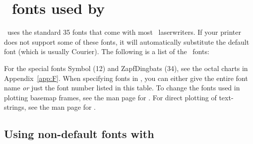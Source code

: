 %
%
\chapter{\PS\ fonts used by \gmt}
\label{app:G}
\thispagestyle{headings}

\GMT\ uses the standard 35 fonts that come with most \PS\
laserwriters.  If your printer does not support some of these
fonts, it will automatically substitute the default font (which is
usually Courier).  The following is
a list of the \GMT\ fonts: \\


For the special fonts Symbol (12) and ZapfDingbats (34), see the
octal charts in Appendix~\ref{app:F}.  When specifying fonts in
\GMT, you can either give the entire font name \emph{or} just the
font number listed in this table.  To change the fonts used in
plotting basemap frames, see the man page for
.  For direct plotting of text-strings, see
the man page for .


\section{Using non-default fonts with \GMT}
\label{sec:non-default-fonts}

